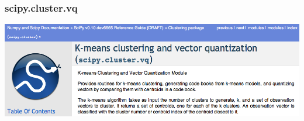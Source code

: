 \begin{frame}[fragile]
\begin{center}
\begin{columns}[c]

    \end{columns}
  \end{center}


\end{frame}


\begin{frame}
  \frametitle{scipy.cluster.vq}

  \begin{center}
    \includegraphics[width=\textwidth]{scipy_cluster_vq.png}
  \end{center}
\end{frame}


